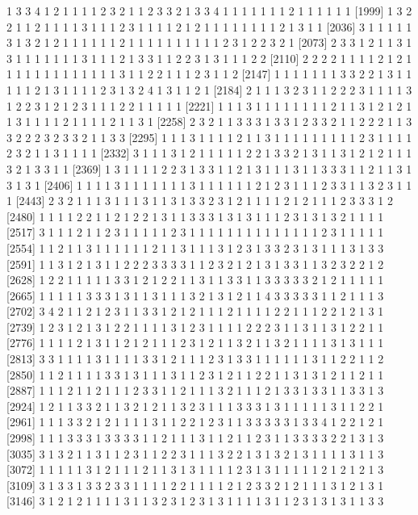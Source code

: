 \begin{Schunk}
\begin{Soutput}
[1962] 1 3 3 4 1 2 1 1 1 1 2 3 2 1 1 2 3 3 2 1 3 3 4 1 1 1 1 1 1 1 2 1 1 1 1 1 1
[1999] 1 3 2 2 1 1 2 1 1 1 1 3 1 1 1 2 3 1 1 1 1 2 1 2 1 1 1 1 1 1 1 1 2 1 3 1 1
[2036] 3 1 1 1 1 1 3 1 3 2 1 2 1 1 1 1 1 1 2 1 1 1 1 1 1 1 1 1 1 2 3 1 2 2 3 2 1
[2073] 2 3 3 1 2 1 1 3 1 3 1 1 1 1 1 1 1 3 1 1 1 2 1 3 3 1 1 2 2 3 1 3 1 1 1 2 2
[2110] 2 2 2 2 1 1 1 1 2 1 2 1 1 1 1 1 1 1 1 1 1 1 1 1 3 1 1 2 2 1 1 1 2 3 1 1 2
[2147] 1 1 1 1 1 1 1 3 3 2 2 1 3 1 1 1 1 1 2 1 3 1 1 1 1 2 3 1 3 2 4 1 3 1 1 2 1
[2184] 2 1 1 1 3 2 3 1 1 2 2 2 3 1 1 1 1 3 1 2 2 3 1 2 1 2 3 1 1 1 2 2 1 1 1 1 1
[2221] 1 1 1 3 1 1 1 1 1 1 1 1 2 1 1 3 1 2 1 2 1 1 3 1 1 1 1 2 1 1 1 1 2 1 1 3 1
[2258] 2 3 2 1 1 3 3 3 1 3 3 1 2 3 3 2 1 1 2 2 2 1 1 3 3 2 2 2 3 2 3 3 2 1 1 3 3
[2295] 1 1 1 3 1 1 1 1 2 1 1 3 1 1 1 1 1 1 1 1 1 2 3 1 1 1 1 2 3 2 1 1 3 1 1 1 1
[2332] 3 1 1 1 3 1 2 1 1 1 1 1 2 2 1 3 3 2 1 3 1 1 3 1 2 1 2 1 1 1 3 2 1 3 3 1 1
[2369] 1 3 1 1 1 1 2 2 3 1 3 3 1 1 2 1 3 1 1 1 3 1 1 3 3 3 1 1 2 1 1 3 1 3 1 3 1
[2406] 1 1 1 1 3 1 1 1 1 1 1 1 3 1 1 1 1 1 1 2 1 2 3 1 1 1 2 3 3 1 1 3 2 3 1 1 1
[2443] 2 3 2 1 1 1 3 1 1 1 3 1 1 3 1 3 3 2 3 1 2 1 1 1 1 2 1 2 1 1 1 2 3 3 3 1 2
[2480] 1 1 1 1 2 2 1 1 2 1 2 2 1 3 1 1 3 3 3 1 3 1 3 1 1 1 2 3 1 3 1 3 2 1 1 1 1
[2517] 3 1 1 1 2 1 1 2 3 1 1 1 1 1 2 3 1 1 1 1 1 1 1 1 1 1 1 1 1 1 2 3 1 1 1 1 1
[2554] 1 1 2 1 1 3 1 1 1 1 1 1 2 1 1 3 1 1 1 3 1 2 3 1 3 3 2 3 1 3 1 1 1 3 1 3 3
[2591] 1 1 3 1 2 1 3 1 1 2 2 2 3 3 3 3 1 1 2 3 2 1 2 1 3 1 3 3 1 1 3 2 3 2 2 1 2
[2628] 1 2 2 1 1 1 1 1 3 3 1 2 1 2 2 1 1 3 1 1 3 3 1 1 3 3 3 3 3 2 1 2 1 1 1 1 1
[2665] 1 1 1 1 1 3 3 3 1 3 1 1 3 1 1 1 3 2 1 3 1 2 1 1 4 3 3 3 3 3 1 1 2 1 1 1 3
[2702] 3 4 2 1 1 2 1 2 3 1 1 3 3 1 2 1 2 1 1 1 2 1 1 1 1 2 2 1 1 1 2 2 1 2 1 3 1
[2739] 1 2 3 1 2 1 3 1 2 2 1 1 1 1 3 1 2 3 1 1 1 1 2 2 2 3 1 1 3 1 1 3 1 2 2 1 1
[2776] 1 1 1 1 2 1 3 1 1 2 1 2 1 1 1 2 3 1 2 1 1 3 2 1 1 3 2 1 1 1 1 3 1 3 1 1 1
[2813] 3 3 1 1 1 1 3 1 1 1 1 3 3 1 2 1 1 1 2 3 1 3 3 1 1 1 1 1 1 3 1 1 2 2 1 1 2
[2850] 1 1 2 1 1 1 1 3 3 1 3 1 1 1 3 1 1 2 3 1 2 1 1 2 2 1 1 3 1 3 1 2 1 1 2 1 1
[2887] 1 1 1 2 1 1 2 1 1 1 2 3 3 1 1 2 1 1 1 3 2 1 1 1 2 1 3 3 1 3 3 1 1 3 3 1 3
[2924] 1 2 1 1 3 3 2 1 1 3 2 1 2 1 1 3 2 3 1 1 1 3 3 3 1 3 1 1 1 1 1 3 1 1 2 2 1
[2961] 1 1 1 3 3 2 1 2 1 1 1 1 3 1 1 2 2 1 2 3 1 1 3 3 3 3 3 1 3 3 4 1 2 2 1 2 1
[2998] 1 1 1 3 3 3 1 3 3 3 3 1 1 2 1 1 1 3 1 1 2 1 1 2 3 1 1 3 3 3 3 2 2 1 3 1 3
[3035] 3 1 3 2 1 1 3 1 1 2 3 1 1 2 2 3 1 1 1 3 2 2 1 3 1 3 2 1 3 1 1 1 1 3 1 1 3
[3072] 1 1 1 1 1 3 1 2 1 1 1 2 1 1 3 1 3 1 1 1 1 2 3 1 3 1 1 1 1 1 2 1 2 1 2 1 3
[3109] 3 1 3 3 1 3 3 2 3 3 1 1 1 1 2 2 1 1 1 1 2 1 2 3 3 2 1 2 1 1 1 3 1 2 1 3 1
[3146] 3 1 2 1 2 1 1 1 1 3 1 1 3 2 3 1 2 3 1 3 1 1 1 1 3 1 1 2 3 1 3 1 3 1 1 3 3

\end{Soutput}
\end{Schunk}

